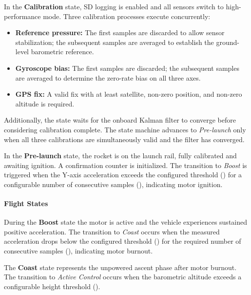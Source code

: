In the \textbf{Calibration} state, SD logging is enabled and all sensors switch to high-performance mode. Three calibration processes execute concurrently:
\begin{itemize}
    \item \textbf{Reference pressure:} The first  samples are discarded to allow sensor stabilization; the subsequent  samples are averaged to establish the ground-level barometric reference.
    \item \textbf{Gyroscope bias:} The first  samples are discarded; the subsequent  samples are averaged to determine the zero-rate bias on all three axes.
    \item \textbf{GPS fix:} A valid fix with at least  satellite, non-zero position, and non-zero altitude is required.
\end{itemize}
Additionally, the state waits for the onboard Kalman filter to converge before considering calibration complete. The state machine advances to \emph{Pre-launch} only when all three calibrations are simultaneously valid and the filter has converged.

In the \textbf{Pre-launch} state, the rocket is on the launch rail, fully calibrated and awaiting ignition. A confirmation counter is initialized. The transition to \emph{Boost} is triggered when the Y-axis acceleration exceeds the configured threshold () for a configurable number of consecutive samples (), indicating motor ignition.

\paragraph{Flight States}

During the \textbf{Boost} state the motor is active and the vehicle experiences sustained positive acceleration. The transition to \emph{Coast} occurs when the measured acceleration drops below the configured threshold () for the required number of consecutive samples (), indicating motor burnout.

The \textbf{Coast} state represents the unpowered ascent phase after motor burnout. The transition to \emph{Active Control} occurs when the barometric altitude exceeds a configurable height threshold ().

